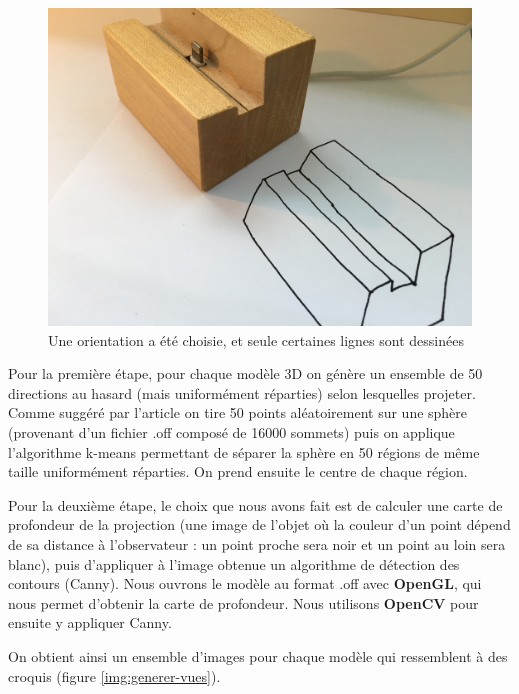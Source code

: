 \documentclass[12pt, a4paper, oneside]{article}
\begin{document}
\begin{figure}
\begin{center}
        \includegraphics[scale=0.038]{images/dock3.jpg}
        \caption{Une orientation a été choisie, et seule certaines lignes sont dessinées}
        \label{img:croquis-exemple}
    \end{center}
\end{figure}

Pour la première étape, pour chaque modèle 3D on génère un ensemble de 50 directions au hasard (mais uniformément réparties) selon lesquelles projeter.
Comme suggéré par l'article on tire 50 points aléatoirement sur une sphère (provenant d'un fichier .off composé de \num{16000} sommets) puis on applique l'algorithme k-means permettant de séparer la sphère en 50 régions de même taille uniformément réparties.
On prend ensuite le centre de chaque région.

Pour la deuxième étape, le choix que nous avons fait est de calculer une carte de profondeur de la projection (une image de l'objet où la couleur d'un point dépend de sa distance à l'observateur : un point proche sera noir et un point au loin sera blanc), puis d'appliquer à l'image obtenue un algorithme de détection des contours (Canny). Nous ouvrons le modèle au format .off avec \textbf{OpenGL}, qui nous permet d'obtenir la carte de profondeur. Nous utilisons \textbf{OpenCV} pour ensuite y appliquer Canny.

On obtient ainsi un ensemble d'images pour chaque modèle qui ressemblent à des croquis (figure \vref{img:generer-vues}).\\
\end{document}
